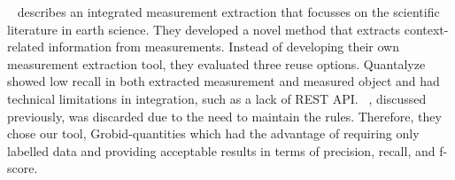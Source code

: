 ~\cite{hundman2017measurement} describes an integrated measurement extraction that focusses on the scientific literature in earth science. 
They developed a novel method that extracts context-related information from measurements. Instead of developing their own measurement extraction tool, they evaluated three reuse options. Quantalyze showed low recall in both extracted measurement and measured object and had technical limitations in integration, such as a lack of REST API. ~\cite{agatonovic2008large}, discussed previously, was discarded due to the need to maintain the rules. 
Therefore, they chose our tool, Grobid-quantities which had the advantage of requiring only labelled data and providing acceptable results in terms of precision, recall, and f-score. 






